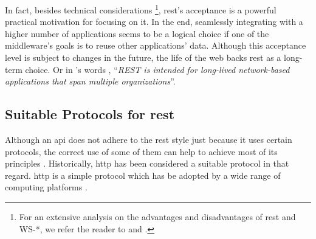 In fact, besides technical considerations
\footnote{For an extensive analysis on the advantages and disadvantages of \ac{rest} and WS-*, we refer the reader to \citep{pautasso_restful_2008} and \citep{guinard_search_2011}.},
\ac{rest}'s acceptance is a powerful practical motivation for focusing on it.
In the end, seamlessly integrating with a higher number of applications seems to be a logical choice if one of the middleware's goals is to reuse other applications' data. %
Although this acceptance level is subject to changes in the future, the life of the web backs \ac{rest} as a long-term choice.
Or in \citeauthor{fielding_architectural_2000}'s words \cite[comment 21]{fielding_rest_2008},
``\emph{REST is intended for long-lived network-based applications that span multiple organizations}''.



\subsection{Suitable Protocols for \ac{rest}}
\label{sec:protocols}

Although an \ac{api} does not adhere to the \ac{rest} style just because it uses certain protocols,
the correct use of some of them can help to achieve most of its principles \citep{moore_hypermedia_2010}.
Historically, \ac{http} has been considered a suitable protocol in that regard.
\ac{http} is a simple protocol which has be adopted by a wide range of computing platforms \citep{yazar_efficient_2009,hammel_mongoose:_2010}.


